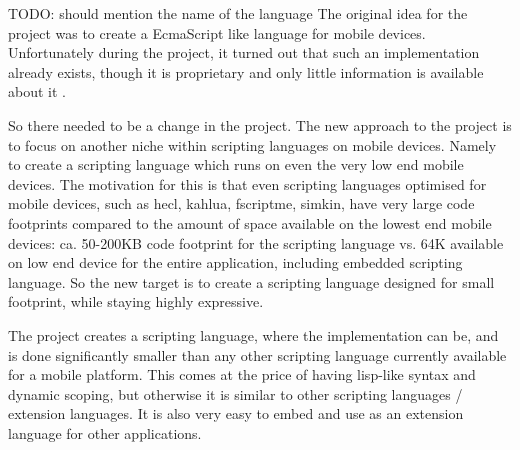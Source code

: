 TODO: should mention the name of the language
The original idea for the project was to create a EcmaScript like language for mobile devices. 
Unfortunately during the project, it turned out that such an implementation already exists,
though it is proprietary and only little information is available about it \cite{mojax}.

So there needed to be a change in the project.
The new approach to the project is to focus on another niche within scripting languages on mobile devices. Namely to create a scripting language which runs on even the very low end mobile devices.
The motivation for this is that even scripting languages optimised for mobile devices, such as hecl\cite{hecl}, kahlua\cite{kahlua}, fscriptme\cite{fscriptme}, simkin\cite{simkin}, have very large code footprints compared to the amount of space available on the lowest end mobile devices: ca. 50-200KB code footprint for the scripting language vs. 64K available on low end device for the entire application, including embedded scripting language.
So the new target is to create a scripting language designed for small footprint, while staying highly expressive.

The project creates a scripting language, where the implementation can be, and is done significantly smaller than any other scripting language currently available for a mobile platform.
This comes at the price of having lisp-like syntax and dynamic scoping, but otherwise it is similar to other scripting languages / extension languages. It is also very easy to embed and use as an extension language for other applications.
